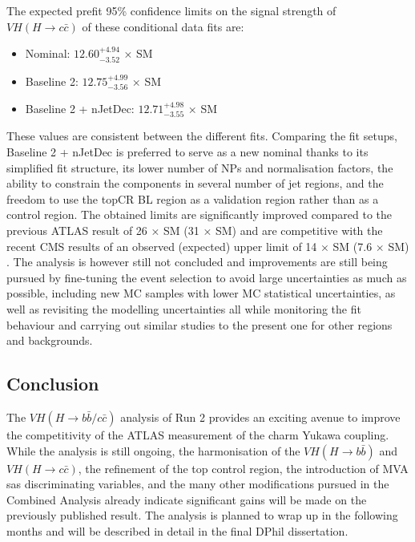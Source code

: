 The expected prefit 95\% confidence limits on the signal strength of $VH(H\rightarrow c\bar{c})$ of these conditional data fits are: 
\begin{itemize}
\item Nominal: $12.60^{+4.94}_{-3.52}$ × SM
\item Baseline 2: $12.75^{+4.99}_{-3.56}$ × SM
\item Baseline 2 + nJetDec: $12.71^{+4.98}_{-3.55}$ × SM
\end{itemize}
These values are consistent between the different fits. Comparing the fit setups, Baseline 2 + nJetDec is preferred to serve as a new nominal thanks to its simplified fit structure, its lower number of NPs and normalisation factors, the ability to constrain the components in several number of jet regions, and the freedom to use the topCR BL region as a validation region rather than as a control region. The obtained limits are significantly improved compared to the previous ATLAS result of 26 × SM (31 × SM) \cite{Collaboration:2721696} and are competitive with the recent CMS results of an observed (expected) upper limit of 14 $\times$ SM (7.6 $\times$ SM) \cite{arXiv:2205.05550}. The analysis is however still not concluded and improvements are still being pursued by fine-tuning the event selection to avoid large uncertainties as much as possible, including new MC samples with lower MC statistical uncertainties, as well as revisiting the modelling uncertainties all while monitoring the fit behaviour and carrying out similar studies to the present one for other regions and backgrounds. 

\subsection{Conclusion}
The $VH(H\rightarrow b\bar{b}/c\bar{c})$ analysis of Run 2 provides an exciting avenue to improve the competitivity of the ATLAS measurement of the charm Yukawa coupling. While the analysis is still ongoing, the harmonisation of the $VH(H\rightarrow b\bar{b})$ and $VH(H\rightarrow c\bar{c})$, the refinement of the top control region, the introduction of MVA sas discriminating variables, and the many other modifications pursued in the Combined Analysis already indicate significant gains will be made on the previously published result. The analysis is planned to wrap up in the following months and will be described in detail in the final DPhil dissertation. 

\clearpage

